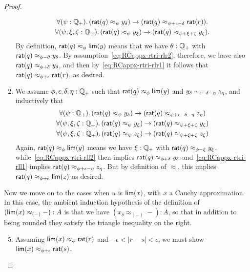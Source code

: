 \begin{proof}
\begin{enumerate}
    \begin{gather}
      \fall{\psi:\Qp}(\rcrat(q) \approx_{\psi} y_\delta) \to (\rcrat(q) \approx_{\psi+\epsilon-\delta} \rcrat(r)).\label{eq:RCappx-rtri-rlr1}\\
      \fall{\psi,\xi,\zeta:\Qp} (\rcrat(q) \approx_{\psi} y_\xi) \to (\rcrat(q) \approx_{\psi+\xi+\zeta} y_\zeta).\label{eq:RCappx-rtri-rlr2}
    \end{gather}
    By definition, $\mathsf{rat}(q)\approx_\phi \mathsf{lim}(y)$ means that we have $\theta:\mathbb{Q}_{+}$ with $\mathsf{rat}(q) \approx_{\phi-\theta} y_\theta$.
    By assumption~\eqref{eq:RCappx-rtri-rlr2}, therefore, we have also $\mathsf{rat}(q) \approx_{\phi+\delta} y_\delta$, and then by~\eqref{eq:RCappx-rtri-rlr1} it follows that $\mathsf{rat}(q) \approx_{\phi+\epsilon} \mathsf{rat}(r)$, as desired.
  \item We assume $\phi,\epsilon,\delta,\eta:\mathbb{Q}_{+}$ such that $\mathsf{rat}(q)\approx_\phi \mathsf{lim}(y)$ and $y_\delta \sim_{\epsilon-\delta-\eta} z_\eta$, and inductively that 
    \begin{gather}
      \fall{\psi:\Qp}(\rcrat(q) \approx_{\psi} y_\delta) \to (\rcrat(q) \approx_{\psi+\epsilon-\delta-\eta} z_\eta)\label{eq:RCappx-rtri-rll1}\\
      \fall{\psi,\xi,\zeta:\Qp} (\rcrat(q) \approx_{\psi} y_\xi) \to (\rcrat(q) \approx_{\psi+\xi+\zeta} y_\zeta)\label{eq:RCappx-rtri-rll2}\\
      \fall{\psi,\xi,\zeta:\Qp} (\rcrat(q) \approx_{\psi} z_\xi) \to (\rcrat(q) \approx_{\psi+\xi+\zeta} z_\zeta)\label{eq:RCappx-rtri-rll3}
    \end{gather}
    Again, $\mathsf{rat}(q)\approx_\phi \mathsf{lim}(y)$ means we have $\xi:\mathbb{Q}_{+}$ with $\mathsf{rat}(q) \approx_{\phi-\xi} y_\xi$, while~\eqref{eq:RCappx-rtri-rll2} then implies $\mathsf{rat}(q) \approx_{\phi+\delta} y_\delta$ and~\eqref{eq:RCappx-rtri-rll1} implies $\mathsf{rat}(q) \approx_{\phi+\epsilon-\eta} z_\eta$.
    But by definition of $\approx$, this implies $\mathsf{rat}(q) \approx_{\phi+\epsilon} \mathsf{lim}(z)$ as desired.
  \end{enumerate}
  Now we move on to the cases when $u$ is $\mathsf{lim}(x)$, with $x$ a Cauchy approximation.
  In this case, the ambient induction hypothesis of the definition of $(\mathsf{lim}(x) \approx_{(-)} {-}) : A$ is that we have ${(x_\delta \approx_{(-)} {-})}: A$, so that in addition to being rounded they satisfy the triangle inequality on the right.
  \begin{enumerate}\setcounter{enumi}{4}
  \item Assuming $\mathsf{lim}(x)\approx_\phi \mathsf{rat}(r)$ and $-\epsilon<|r-s|<\epsilon$, we must show $\mathsf{lim}(x)\approx_{\phi+\epsilon} \mathsf{rat}(s)$.

\end{enumerate}
\end{proof}
